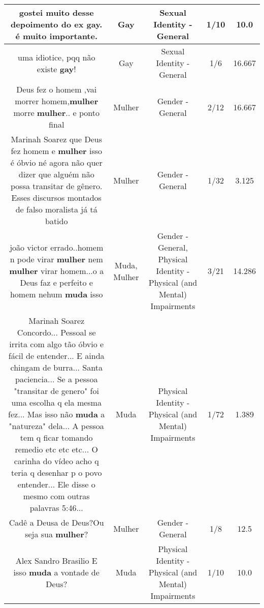 \documentclass[11pt]{article}
\newlength\mylength
\begin{document}
\begin{center}
\begin{longtable}{|C{.65\mylength}|C{.30\mylength}|C{.12\mylength}|C{.12\mylength}|C{.12\mylength}|}
  \small gostei muito desse depoimento do ex \textbf{gay}. é muito importante.\normalsize   & Gay & Sexual Identity - General & 1/10 & 10.0 \\  \hline
  \small uma idiotice, pqq não existe \textbf{gay}!\normalsize   & Gay & Sexual Identity - General & 1/6 & 16.667 \\  \hline
  \small Deus fez o homem ,vai morrer homem,\textbf{mulher} morre \textbf{mulher}.. e ponto final\normalsize   & Mulher & Gender - General & 2/12 & 16.667 \\  \hline
  \small Marinah Soarez que Deus fez homem e \textbf{mulher} isso é óbvio né agora não quer dizer que alguém não possa transitar de gênero. Esses discursos montados de falso moralista já tá batido\normalsize   & Mulher & Gender - General & 1/32 & 3.125 \\  \hline
  \small joão victor errado..homem n pode virar \textbf{mulher} nem \textbf{mulher} virar homem...o a Deus faz e perfeito e homem nehum \textbf{muda} isso\normalsize   & Muda, Mulher & Gender - General, Physical Identity - Physical (and Mental) Impairments & 3/21 & 14.286 \\  \hline
  \small Marinah Soarez Concordo... Pessoal se irrita com algo tão óbvio e fácil de entender... E ainda chingam de burra... Santa paciencia... Se a pessoa "transitar de genero" foi uma escolha q ela mesma fez... Mas isso não \textbf{muda} a "natureza" dela... A pessoa tem q ficar tomando remedio etc etc etc... O carinha do vídeo acho q teria q desenhar p o povo entender... Ele disse o mesmo com outras palavras 5:46...\normalsize   & Muda & Physical Identity - Physical (and Mental) Impairments & 1/72 & 1.389 \\  \hline
  \small Cadê a Deusa de Deus?Ou seja sua \textbf{mulher}?\normalsize   & Mulher & Gender - General & 1/8 & 12.5 \\  \hline
  \small Alex Sandro Brasilio E isso \textbf{muda} a vontade de Deus?\normalsize   & Muda & Physical Identity - Physical (and Mental) Impairments & 1/10 & 10.0 \\  \hline

\end{longtable}
\end{center}
\end{document}

